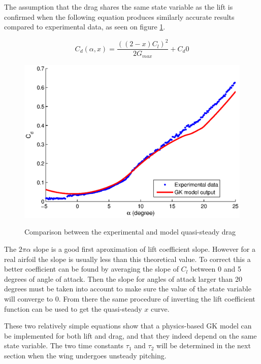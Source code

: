 \par The assumption that the drag shares the same state variable as the lift is confirmed when the following equation produces similarly accurate results compared to experimental data, as seen on figure \ref{fig:GK_Cd_vs_alpha}.

\begin{equation}
  C_d(\alpha,x)= \frac{ \left( \left( 2 - x \right)C_l \right)^2 }{2 G_{max}} + C_d0
  \label{eqn:Cd_function}
\end{equation}

\begin{figure}[h]
  \begin{center}
    \scalebox{1.0}
    {\includegraphics{./Figures/GK_cd_vs_alpha.eps}}
  \end{center}
  \caption{Comparison between the experimental and model quasi-steady drag}
  \label{fig:GK_Cd_vs_alpha}
\end{figure}

\par The $2\pi\alpha$ slope is a good first aproximation of lift coefficient slope.
However for a real airfoil the slope is usually less than this theoretical value.
To correct this a better coefficient can be found by averaging the slope of $C_l$ between 0 and 5 degrees of angle of attack.
Then the slope for angles of attack larger than 20 degrees must be taken into account to make sure the value of the state variable will converge to 0.
From there the same procedure of inverting the lift coefficient function can be used to get the quasi-steady $x$ curve.

\par These two relatively simple equations show that a physics-based GK model can be implemented for both lift and drag, and that they indeed depend on the same state variable.
The two time constants $\tau_1$ and $\tau_2$ will be determined in the next section when the wing undergoes unsteady pitching.

